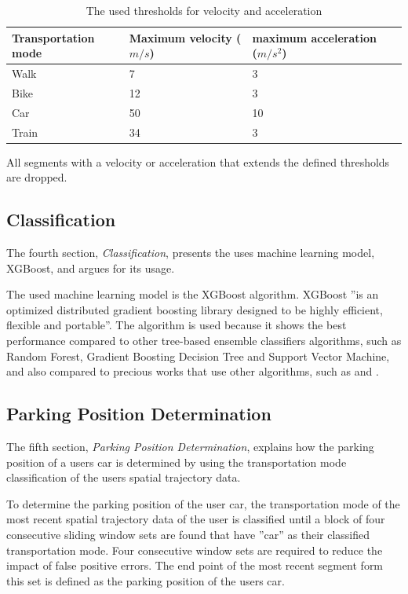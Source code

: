 \begin{table}[h!]
    \centering
    \begin{tabular}{l l l l} 
     \hline
     Transportation mode & Maximum velocity ($m/s$) & maximum acceleration ($m/s^2$)\\
     \hline
     Walk & 7 & 3 \\
     Bike & 12 & 3 \\
     Car & 50 & 10 \\
     Train & 34 & 3 \\
     \hline
    \end{tabular}
    \caption{The used thresholds for velocity and acceleration \cite{Dabiri2018}}
    \label{table:thresholds}
\end{table}

All segments with a velocity or acceleration that extends the defined thresholds are dropped. 

\subsection{Classification}
The fourth section, \textit{Classification}, presents the uses machine learning model, XGBoost, and argues for its usage.

The used machine learning model is the XGBoost algorithm. XGBoost ''is an optimized distributed gradient boosting library designed to be highly efficient, flexible and portable''. The algorithm is used because it shows the best performance compared to other tree-based ensemble classifiers algorithms, such as Random Forest, Gradient Boosting Decision Tree and Support Vector Machine, and also compared to precious works that use other algorithms, such as \cite{Zheng2008} and \cite{dodge2009revealing}. \cite{Xiao2017} \cite{chen2016xgboost}

\subsection{Parking Position Determination}
The fifth section, \textit{Parking Position Determination}, explains how the parking position of a users car is determined by using the transportation mode classification of the users spatial trajectory data. 

To determine the parking position of the user car, the transportation mode of the most recent spatial trajectory data of the user is classified until a block of four consecutive sliding window sets are found that have ''car'' as their classified transportation mode. Four consecutive window sets are required to reduce the impact of false positive errors. The end point of the most recent segment form this set is defined as the parking position of the users car. 
